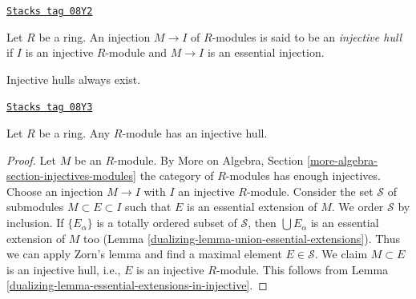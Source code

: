 \begin{definition}
\label{dualizing-definition-injective-hull}
\href{https://stacks.math.columbia.edu/tag/08Y2}{\texttt{Stacks tag 08Y2}}

Let $R$ be a ring. An injection $M \to I$ of $R$-modules is said
to be an {\it injective hull} if $I$ is an injective $R$-module and
$M \to I$ is an essential injection.
\end{definition}

Injective hulls always exist.

\begin{lemma}
\label{dualizing-lemma-injective-hull}
\href{https://stacks.math.columbia.edu/tag/08Y3}{\texttt{Stacks tag 08Y3}}

Let $R$ be a ring. Any $R$-module has an injective hull.
\end{lemma}

\begin{proof}

Let $M$ be an $R$-module. By
More on Algebra, Section \ref{more-algebra-section-injectives-modules}
the category of $R$-modules has enough injectives.
Choose an injection $M \to I$ with $I$ an injective $R$-module.
Consider the set $\mathcal{S}$ of submodules $M \subset E \subset I$
such that $E$ is an essential extension of $M$. We order $\mathcal{S}$
by inclusion. If $\{E_\alpha\}$ is a totally ordered subset
of $\mathcal{S}$, then $\bigcup E_\alpha$ is an essential extension of $M$
too (Lemma \ref{dualizing-lemma-union-essential-extensions}).
Thus we can apply Zorn's lemma and find a maximal element
$E \in \mathcal{S}$. We claim $M \subset E$ is an injective hull, i.e.,
$E$ is an injective $R$-module. This follows from
Lemma \ref{dualizing-lemma-essential-extensions-in-injective}.
\end{proof}

